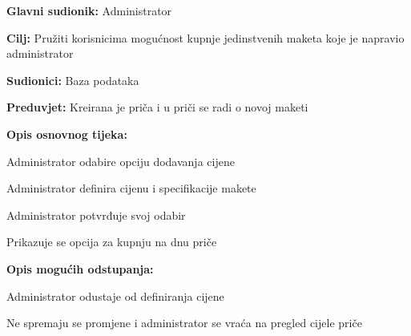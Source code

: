 					\noindent {}
					\begin{packed_item}
						
						\item \textbf{Glavni sudionik: }Administrator
						\item  \textbf{Cilj:} Pružiti korisnicima mogućnost kupnje jedinstvenih maketa koje je napravio administrator
						\item  \textbf{Sudionici:} Baza podataka
						\item  \textbf{Preduvjet:} Kreirana je priča i u priči se radi o novoj maketi
						\item  \textbf{Opis osnovnog tijeka:}
						
						\item[] \begin{packed_enum}
							
							\item Administrator odabire opciju dodavanja cijene
							\item Administrator definira cijenu i specifikacije makete
							\item Administrator potvrđuje svoj odabir
							\item Prikazuje se opcija za kupnju na dnu priče
						\end{packed_enum}
						\item  \textbf{Opis mogućih odstupanja:}
					
						\item[] \begin{packed_item}
							
							\item[2.a] Administrator odustaje od definiranja cijene
							
							\item[] \begin{packed_enum}
								
								\item Ne spremaju se promjene i administrator se vraća na pregled cijele priče
								
							\end{packed_enum}
							
						\end{packed_item}
					\end{packed_item}
				
